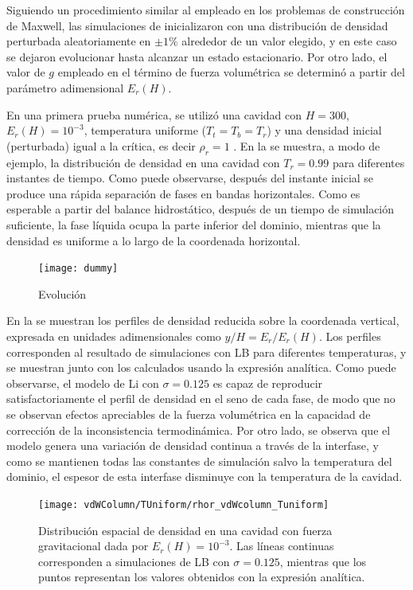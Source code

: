 Siguiendo un procedimiento similar al empleado en los problemas de construcci\'on de Maxwell, las simulaciones de inicializaron con una distribuci\'on de densidad perturbada aleatoriamente en $\pm1\%$ alrededor de un valor elegido, y en este caso se dejaron evolucionar hasta alcanzar un estado estacionario. Por otro lado, el valor de $g$ empleado en el t\'ermino de fuerza volum\'etrica se determin\'o a partir del par\'ametro adimensional $E_r(H)$.

En una primera prueba num\'erica, se utiliz\'o una cavidad con $H=300$, $E_r(H)=10^{-3}$, temperatura uniforme ($T_t = T_b = T_r$) y una densidad inicial (perturbada) igual a la cr\'itica, es decir $\rho_r=1$ . En la  se muestra, a modo de ejemplo, la distribuci\'on de densidad en una cavidad con $T_r=0.99$ para diferentes instantes de tiempo. Como puede observarse, despu\'es del instante inicial se produce una r\'apida separaci\'on de fases en  bandas horizontales. Como es esperable a partir del balance hidrost\'atico, despu\'es de un tiempo de simulaci\'on suficiente, la fase l\'iquida ocupa la parte inferior del dominio, mientras que la densidad es uniforme a lo largo de la coordenada horizontal.

\begin{figure}[ht]
	\centering
	\texttt{[image: dummy]}
	\caption{Evoluci\'on}
	\label{fig:vdWColumn_evolucion}
\end{figure}

En la  se muestran los perfiles de densidad reducida sobre la coordenada vertical, expresada en unidades adimensionales como $y/H = E_r/E_r(H)$. Los perfiles corresponden al resultado de simulaciones con LB para diferentes temperaturas, y se muestran junto con los calculados usando la expresi\'on anal\'itica. Como puede observarse, el modelo \pp{} de Li con $\sigma=0.125$ es capaz de reproducir satisfactoriamente el perfil de densidad en el seno de cada fase, de modo que no se observan efectos apreciables de la fuerza volum\'etrica en la capacidad de correcci\'on de la inconsistencia termodin\'amica. Por otro lado, se observa que el modelo genera una variaci\'on de densidad continua a trav\'es de la interfase, y como se mantienen todas las constantes de simulaci\'on salvo la temperatura del dominio, el espesor de esta interfase disminuye con la temperatura de la cavidad.

\begin{figure}[ht]
	\centering
	\texttt{[image: vdWColumn/TUniform/rhor\_vdWcolumn\_Tuniform]}
	\caption{Distribuci\'on espacial de densidad en una cavidad con fuerza gravitacional dada por $E_r(H)=10^{-3}$. Las l\'ineas continuas corresponden a simulaciones de LB con $\sigma=0.125$, mientras que los puntos representan los valores obtenidos con la expresi\'on anal\'itica.}
	\label{fig:vdWColumn_rhor_tuniform}
\end{figure}

